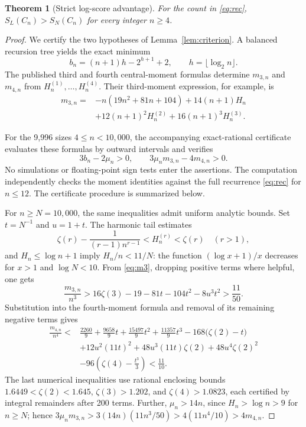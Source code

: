\documentclass[10pt,letterpaper]{article}
\newtheorem{theorem}{Theorem}
\begin{document}
\begin{theorem}[Strict log-score advantage]\label{thm:finite}
For the count in \eqref{eq:rec}, $S_L(C_n)>S_N(C_n)$ for every integer $n\ge4$.
\end{theorem}
\begin{proof}
We certify the two hypotheses of Lemma~\ref{lem:criterion}. A balanced recursion tree yields the exact minimum
\begin{equation}
b_n=(n+1)h-2^{h+1}+2,\qquad h=\lfloor\log_2n\rfloor.   \label{eq:min}
\end{equation}
The published third and fourth central-moment formulas \cite[Thms.~2.3--2.4]{yao} determine $m_{3,n}$ and $m_{4,n}$ from $H_n^{(1)},\ldots,H_n^{(4)}$. Their third-moment expression, for example, is
\begin{align}
m_{3,n}={}&-n(19n^2+81n+104)+14(n+1)H_n\nonumber\\
&+12(n+1)^2H_n^{(2)}+16(n+1)^3H_n^{(3)}.                 \label{eq:m3}
\end{align}

For the 9,996 sizes $4\le n<10{,}000$, the accompanying exact-rational certificate evaluates these formulas by outward intervals and verifies
\begin{equation}
3b_n-2\mu_n>0,\qquad 3\mu_nm_{3,n}-4m_{4,n}>0.          \label{eq:checks}
\end{equation}
No simulations or floating-point sign tests enter the assertions. The computation independently checks the moment identities against the full recurrence \eqref{eq:rec} for $n\le12$. The certificate procedure is summarized below.

For $n\ge N=10{,}000$, the same inequalities admit uniform analytic bounds. Set $t=N^{-1}$ and $u=1+t$. The harmonic tail estimates
\begin{equation}
\zeta(r)-\frac{1}{(r-1)n^{r-1}}<H_n^{(r)}<\zeta(r)
\quad(r>1),                                                \label{eq:tails}
\end{equation}
and $H_n\le\log n+1$ imply $H_n/n<11/N$: the function $(\log x+1)/x$ decreases for $x>1$ and $\log N<10$. From \eqref{eq:m3}, dropping positive terms where helpful, one gets
\begin{equation}
\frac{m_{3,n}}{n^3}>16\zeta(3)-19-81t-104t^2-8u^3t^2
>\frac{11}{50}.                                          \label{eq:large3}
\end{equation}
Substitution into the fourth-moment formula and removal of its remaining negative terms gives
\begin{align}
\frac{m_{4,n}}{n^4}<{}&\frac{2260}{9}+\frac{9658}{9}t+\frac{15497}{9}t^2+\frac{11357}{9}t^3
-168\bigl(\zeta(2)-t\bigr)\nonumber\\
&+12u^2(11t)^2+48u^3(11t)\zeta(2)
+48u^4\zeta(2)^2\nonumber\\
&-96\left(\zeta(4)-\frac{t^3}{3}\right)<\frac{11}{10}. \label{eq:large4}
\end{align}
The last numerical inequalities use rational enclosing bounds
$1.6449<\zeta(2)<1.645$, $\zeta(3)>1.202$, and $\zeta(4)>1.0823$, each certified by integral remainders after 200 terms. Further, $\mu_n>14n$, since $H_n>\log n>9$ for $n\ge N$; hence $3\mu_nm_{3,n}>3(14n)(11n^3/50)>4(11n^4/10)>4m_{4,n}$.


\end{proof}
\end{document}
